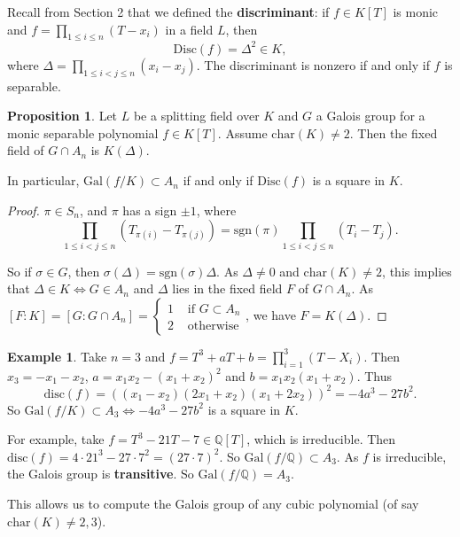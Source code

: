\documentclass{article}
\theoremstyle{definition}
\newtheorem{prop}[theorem]{Proposition}
\newtheorem{example}{Example}[section]
\begin{document}
Recall from Section 2 that we defined the \textbf{discriminant}: if $f \in K[T]$ is monic and $f = \prod_{1\le i \le n}^{} (T-x_i)$ in a field $L$, then
\[
\text{Disc}(f) = \Delta^2 \in K,
\]
where $\Delta = \prod_{1\le i < j \le n}^{} (x_i-x_j)$. The discriminant is nonzero if and only if $f$ is separable.
\begin{prop}
    Let $L$ be a splitting field over $K$ and $G$ a Galois group for a monic separable polynomial $f \in K[T]$. Assume $\text{char}(K)\neq 2$. Then the fixed field of $G \cap A_n$ is $K(\Delta)$.
    \vspace{1mm}

    In particular, $\text{Gal}(f/K) \subset A_n$ if and only if $\text{Disc}(f)$ is a square in $K$.
\end{prop}

\begin{proof}

    $\pi \in S_n$, and $\pi$ has a sign $\pm 1$, where $$\prod_{1\le i<j\le n}^{} (T_{\pi(i)}-T_{\pi(j)})=\text{sgn}(\pi)\prod_{1\le i<j\le n}^{} (T_i-T_j).$$

    So if $\sigma \in G$, then $\sigma(\Delta) = \text{sgn}(\sigma)\Delta$. As $\Delta \neq 0$ and $\text{char}(K)\neq 2$, this implies that $\Delta \in K \iff G \in A_n$ and $\Delta$ lies in the fixed field $F$ of $G \cap A_n$. As $[F: K] = [G : G \cap A_n] = \begin{cases}
        1 &\text{ if } G \subset A_n \\
        2 &\text{ otherwise}
    \end{cases}$, we have $F = K(\Delta)$.
\end{proof}
\begin{example}
    Take $n=3$ and $f = T^3+aT+b = \prod_{i=1}^{3} (T-X_i)$. Then $x_3 = -x_1-x_2$, $a = x_1x_2 - (x_1+x_2)^2$ and $b=x_1x_2(x_1+x_2)$. Thus \[
    \text{disc}(f) = ((x_1-x_2)(2x_1+x_2)(x_1+2x_2))^2 = -4a^3 - 27b^2.
    \]
    So $\text{Gal}(f/K) \subset A_3 \iff -4a^3-27b^2$ is a square in $K$.
    \vspace{1mm}

    For example, take $f = T^3-21T - 7 \in \mathbb{Q}[T]$, which is irreducible. Then $\text{disc}(f)=4 \cdot 21^3 - 27 \cdot  7 ^2 = (27\cdot 7)^2$. So $\text{Gal}(f/\mathbb{Q}) \subset A_3$. As $f$ is irreducible, the Galois group is \textbf{transitive}. So $\text{Gal}(f/\mathbb{Q}) = A_3$.
\end{example}
This allows us to compute the Galois group of any cubic polynomial (of say $\text{char}(K)\neq2,3$).
\end{document}
